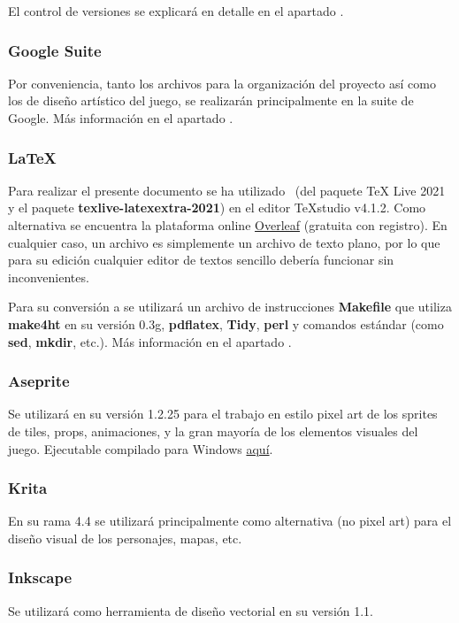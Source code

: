 El control de versiones se explicará en detalle en el apartado .

\subsubsection{Google Suite}
Por conveniencia, tanto los archivos para la organización del proyecto así como
los de diseño artístico del juego, se realizarán principalmente en la suite de
Google. Más información en el apartado .

\subsubsection{LaTeX}
Para realizar el presente documento se ha utilizado \LaTeXe\ (del paquete TeX
Live 2021 y el paquete \textbf{texlive-latexextra-2021}) en el editor TeXstudio
v4.1.2.  Como alternativa se encuentra la plataforma online
\href{https://www.overleaf.com/}{Overleaf} (gratuita con registro). En
cualquier caso, un archivo  es simplemente un archivo de texto plano,
por lo que para su edición cualquier editor de textos sencillo debería
funcionar sin inconvenientes.

Para su conversión a  se utilizará un archivo de instrucciones
\textbf{Makefile} que utiliza \textbf{make4ht} en su versión 0.3g,
\textbf{pdflatex}, \textbf{Tidy}, \textbf{perl} y comandos  estándar
(como \textbf{sed}, \textbf{mkdir}, etc.). Más información en el apartado
.

\subsubsection{Aseprite}
Se utilizará en su versión 1.2.25 para el trabajo en estilo pixel art de los
sprites de tiles, props, animaciones,  y la gran mayoría de los
elementos visuales del juego. Ejecutable compilado para Windows
\href{https://drive.google.com/drive/folders/1DPhGeg7WzV9j81u3B5isgsXqoMtfd_Uv?usp=sharing}{aquí}.

\subsubsection{Krita}
En su rama 4.4 se utilizará principalmente como alternativa (no pixel art) para
el diseño visual de los personajes, mapas, etc.

\subsubsection{Inkscape}
Se utilizará como herramienta de diseño vectorial en su versión 1.1.

